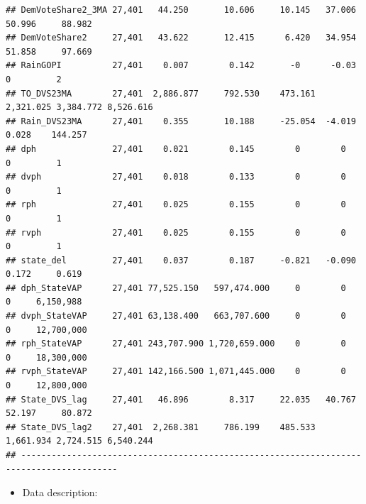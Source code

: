 \documentclass[]{book}
\providecommand{\tightlist}{%
  \setlength{\itemsep}{0pt}\setlength{\parskip}{0pt}}
\begin{document}
\begin{verbatim}
## DemVoteShare2_3MA 27,401   44.250       10.606     10.145   37.006    50.996     88.982  
## DemVoteShare2     27,401   43.622       12.415      6.420   34.954    51.858     97.669  
## RainGOPI          27,401    0.007        0.142       -0      -0.03       0         2     
## TO_DVS23MA        27,401  2,886.877     792.530    473.161 2,321.025 3,384.772 8,526.616 
## Rain_DVS23MA      27,401    0.355       10.188     -25.054  -4.019     0.028    144.257  
## dph               27,401    0.021        0.145        0        0         0         1     
## dvph              27,401    0.018        0.133        0        0         0         1     
## rph               27,401    0.025        0.155        0        0         0         1     
## rvph              27,401    0.025        0.155        0        0         0         1     
## state_del         27,401    0.037        0.187     -0.821   -0.090     0.172     0.619   
## dph_StateVAP      27,401 77,525.150   597,474.000     0        0         0     6,150,988 
## dvph_StateVAP     27,401 63,138.400   663,707.600     0        0         0     12,700,000
## rph_StateVAP      27,401 243,707.900 1,720,659.000    0        0         0     18,300,000
## rvph_StateVAP     27,401 142,166.500 1,071,445.000    0        0         0     12,800,000
## State_DVS_lag     27,401   46.896        8.317     22.035   40.767    52.197     80.872  
## State_DVS_lag2    27,401  2,268.381     786.199    485.533 1,661.934 2,724.515 6,540.244 
## -----------------------------------------------------------------------------------------
\end{verbatim}

\begin{itemize}
\tightlist
\item
  Data description:
\end{itemize}
\end{document}

